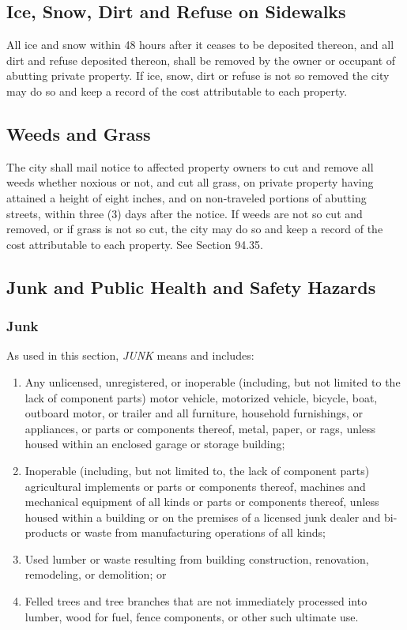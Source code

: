 \documentclass[code.tex]{subfiles}
\begin{document}
\subsection{Ice, Snow, Dirt and Refuse on Sidewalks}
All ice and snow within 48 hours after it ceases to be deposited thereon, and all dirt and refuse deposited thereon, shall be removed by the owner or occupant of abutting private property.  If ice, snow, dirt or refuse is not so removed the city may do so and keep a record of the cost attributable to each property.
\subsection{Weeds and Grass}
The city shall mail notice to affected property owners to cut and remove all weeds whether noxious or not, and cut all grass, on private property having attained a height of eight inches, and on non-traveled portions of abutting streets, within three (3) days after the notice.  If weeds are not so cut and removed, or if grass is not so cut, the city may do so and keep a record of the cost attributable to each property. See Section 94.35.
\subsection{Junk and Public Health and Safety Hazards}
\subsubsection{Junk}  As used in this section, \emph{JUNK} means and includes:
\begin{enumerate}[{\indent}a)]
    \item Any unlicensed, unregistered, or inoperable (including, but not limited to the lack of component parts) motor vehicle, motorized vehicle, bicycle, boat, outboard motor, or trailer and all furniture, household furnishings, or appliances, or parts or components thereof, metal, paper, or rags, unless housed within an enclosed garage or storage building; 
    \item Inoperable (including, but not limited to, the lack of component parts) agricultural implements or parts or components thereof, machines and mechanical equipment of all kinds or parts or components thereof, unless housed within a building or on the premises of a licensed junk dealer and bi-products or waste from manufacturing operations of all kinds; 
    \item Used lumber or waste resulting from building construction, renovation, remodeling, or demolition; or 
    \item Felled trees and tree branches that are not immediately processed into lumber, wood for fuel, fence components, or other such ultimate use.
\end{enumerate}
\end{document}
